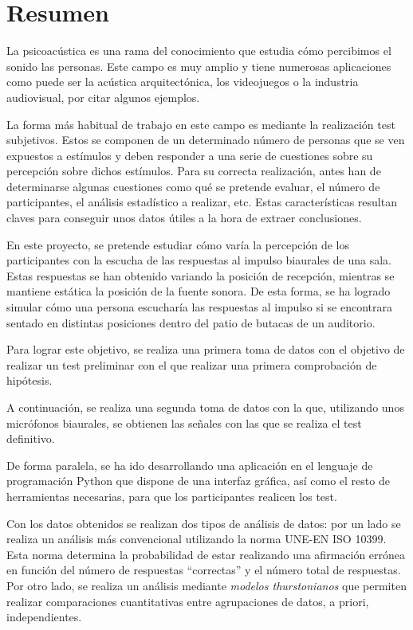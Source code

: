 \documentclass[11pt,a4paper]{book}
\author{Víctor de Tejada Molera}
\begin{document}
\chapter*{Resumen}
    La psicoacústica es una rama del conocimiento que estudia cómo percibimos el sonido las personas. Este campo es muy amplio y tiene numerosas aplicaciones como puede ser la acústica arquitectónica, los videojuegos o la industria audiovisual, por citar algunos ejemplos.

    La forma más habitual de trabajo en este campo es mediante la realización test subjetivos. Estos se componen de un determinado número de personas que se ven expuestos a estímulos y deben responder a una serie de cuestiones sobre su percepción sobre dichos estímulos. Para su correcta realización, antes han de determinarse algunas cuestiones como qué se pretende evaluar, el número de participantes, el análisis estadístico a realizar, etc. Estas características resultan claves para conseguir unos datos útiles a la hora de extraer conclusiones.

    En este proyecto, se pretende estudiar cómo varía la percepción de los participantes con la escucha de las respuestas al impulso biaurales de una sala. Estas respuestas se han obtenido variando la posición de recepción, mientras se mantiene estática la posición de la fuente sonora. De esta forma, se ha logrado simular cómo una persona escucharía las respuestas al impulso si se encontrara sentado en distintas posiciones dentro del patio de butacas de un auditorio.

    Para lograr este objetivo, se realiza una primera toma de datos con el objetivo de realizar un test preliminar con el que realizar una primera comprobación de hipótesis. 

    A continuación, se realiza una segunda toma de datos con la que, utilizando unos micrófonos biaurales, se obtienen las señales con las que se realiza el test definitivo.

    De forma paralela, se ha ido desarrollando una aplicación en el lenguaje de programación Python que dispone de una interfaz gráfica, así como el resto de herramientas necesarias, para que los participantes realicen los test.

    Con los datos obtenidos se realizan dos tipos de análisis de datos: por un lado se realiza un análisis más convencional utilizando la norma UNE-EN ISO 10399. Esta norma determina la probabilidad de estar realizando una afirmación errónea en función del número de respuestas ``correctas'' y el número total de respuestas. Por otro lado, se realiza un análisis mediante \textit{modelos thurstonianos} que permiten realizar comparaciones cuantitativas entre agrupaciones de datos, a priori, independientes.
\end{document}
